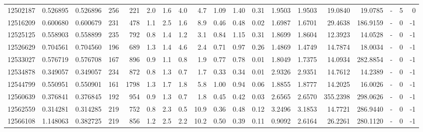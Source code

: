 \begin{tabular}{rrrrrrrrrrrrrrrrlrr}
  12502187 & 0.526895 &   0.526896 &  256 &  221 &      2.0 &      1.6 &     4.0 &      4.7 &       1.09 &        1.40 &        0.31 &  1.9503 &  1.9503 &   19.0840 &   19.0785 &             - &        5 &          0 \\
  12516209 & 0.600680 &   0.600679 &  231 &  478 &      1.1 &      2.5 &     1.6 &      8.9 &       0.46 &        0.48 &        0.02 &  1.6987 &  1.6701 &   29.4638 &  186.9159 &             - &        0 &         -1 \\
  12525125 & 0.558903 &   0.558899 &  235 &  792 &      0.8 &      1.4 &     1.2 &      3.1 &       0.84 &        1.15 &        0.31 &  1.8699 &  1.8604 &   12.3923 &   14.0528 &             - &        0 &         -1 \\
  12526629 & 0.704561 &   0.704560 &  196 &  689 &      1.3 &      1.4 &     4.6 &      2.4 &       0.71 &        0.97 &        0.26 &  1.4869 &  1.4749 &   14.7874 &   18.0034 &             - &        0 &         -1 \\
  12533027 & 0.576719 &   0.576708 &  167 &  896 &      0.9 &      1.1 &     0.8 &      1.9 &       0.77 &        0.78 &        0.01 &  1.8049 &  1.7375 &   14.0934 &  282.8854 &             - &        0 &         -1 \\
  12534878 & 0.349057 &   0.349057 &  234 &  872 &      0.8 &      1.3 &     0.7 &      1.7 &       0.33 &        0.34 &        0.01 &  2.9326 &  2.9351 &   14.7612 &   14.2389 &             - &        0 &         -1 \\
  12544799 & 0.550951 &   0.550901 &  161 & 1798 &      1.3 &      1.7 &     1.8 &      5.8 &       1.00 &        0.94 &        0.06 &  1.8855 &  1.8777 &   14.2025 &   16.0026 &             - &        0 &         -1 \\
  12560639 & 0.376841 &   0.376845 &  192 &  954 &      0.9 &      1.3 &     0.7 &      1.8 &       0.45 &        0.42 &        0.03 &  2.6565 &  2.6570 &  355.2398 &  298.0626 &             - &        0 &         -1 \\
  12562559 & 0.314281 &   0.314285 &  219 &  752 &      0.8 &      2.3 &     0.5 &     10.9 &       0.36 &        0.48 &        0.12 &  3.2496 &  3.1853 &   14.7721 &  286.9440 &             - &        0 &         -1 \\
  12566108 & 1.148063 &   0.382725 &  219 &  856 &      1.2 &      2.5 &     2.2 &     10.2 &       0.50 &        0.39 &        0.11 &  0.9092 &  2.6164 &   26.2261 &  280.1120 &             - &        0 &         -1 \\

\end{tabular}
